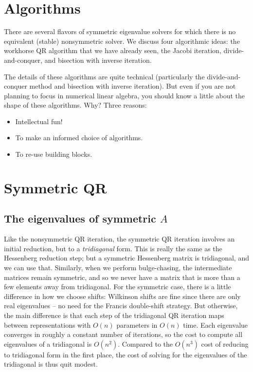 \documentclass[12pt, leqno]{article} %
\begin{document}

\section{Algorithms}

There are several flavors of symmetric eigenvalue solvers for which
there is no equivalent (stable) nonsymmetric solver.  We discuss four
algorithmic ideas: the workhorse QR algorithm that we have already
seen, the Jacobi iteration, divide-and-conquer, and bisection with
inverse iteration.

The details of these algorithms are quite technical (particularly
the divide-and-conquer method and bisection with inverse iteration).
But even if you are not planning to focus in numerical linear algebra,
you should know a little about the shape of these algorithms.  Why?
Three reasons:
\begin{itemize}
\item Intellectual fun!
\item To make an informed choice of algorithms.
\item To re-use building blocks.
\end{itemize}

\section{Symmetric QR}

\subsection{The eigenvalues of symmetric $A$}

Like the nonsymmetric QR iteration, the symmetric QR iteration involves
an initial reduction, but to a {\em tridiagonal} form.  This is really
the same as the Hessenberg reduction step; but a symmetric Hessenberg
matrix is tridiagonal, and we can use that.  Similarly, when we perform
bulge-chasing, the intermediate matrices remain symmetric, and so we
never have a matrix that is more than a few elements away from
tridiagonal.  For the symmetric case, there is a little difference in
how we choose shifts: Wilkinson shifts are fine since there are only
real eigenvalues -- no need for the Francis double-shift strategy. But
otherwise, the main difference is that each step of the tridiagonal QR
iteration maps between representations with $O(n)$ parameters in $O(n)$
time.  Each eigenvalue converges in roughly a constant number of
iterations, so the cost to compute all eigenvalues of a tridiagonal is
$O(n^2)$.  Compared to the $O(n^3)$ cost of reducing to tridiagonal form
in the first place, the cost of solving for the eigenvalues of the
tridiagonal is thus quit modest.
\end{document}
